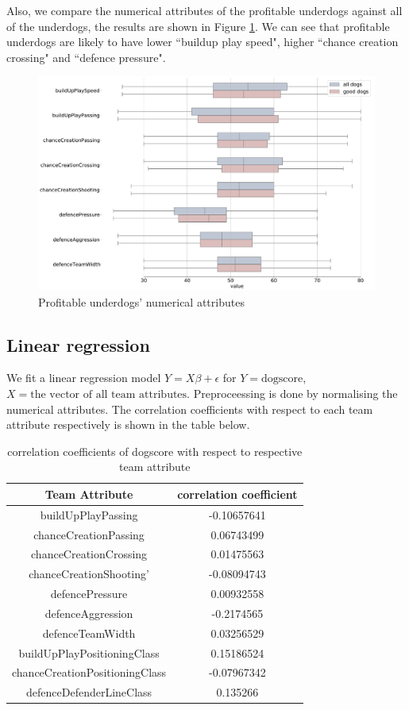 \documentclass[12pt, a4paper]{article}
\begin{document}
Also, we compare the numerical attributes of the profitable underdogs against all of the underdogs, the results are shown in Figure \ref{fig:underdog_attributes}. We can see that profitable underdogs are likely to have lower ``buildup play speed", higher ``chance creation crossing" and ``defence pressure".

\begin{figure}[!ht]
    \centering
    \includegraphics[width=15cm]{dog2.pdf}
    \caption{Profitable underdogs' numerical attributes}
    \label{fig:underdog_attributes}
\end{figure}

\subsection {Linear regression}
We fit a linear regression model $Y = X\beta + \epsilon$ for $Y = \text{dogscore}$, $X = \text{the vector of all team attributes}$. Preproceessing is done by normalising the numerical attributes. The correlation coefficients with respect to
each team attribute respectively is shown in the table below.
\begin{table}[!ht]
    \centering
    \begin{tabular}{|c|c|}
    \hline Team Attribute & correlation coefficient \\
    \hline buildUpPlayPassing & -0.10657641\\
    \hline chanceCreationPassing & 0.06743499 \\
    \hline chanceCreationCrossing & 0.01475563 \\
    \hline chanceCreationShooting' &  -0.08094743 \\
    \hline defencePressure & 0.00932558 \\
    \hline defenceAggression &  -0.2174565\\
    \hline defenceTeamWidth & 0.03256529\\
    \hline buildUpPlayPositioningClass & 0.15186524\\
    \hline chanceCreationPositioningClass & -0.07967342\\
    \hline defenceDefenderLineClass & 0.135266\\
    \hline
    \end{tabular}
    \caption{correlation coefficients of dogscore with respect to respective team attribute}
    \label{tab:my_label}
\end{table}
\end{document}

